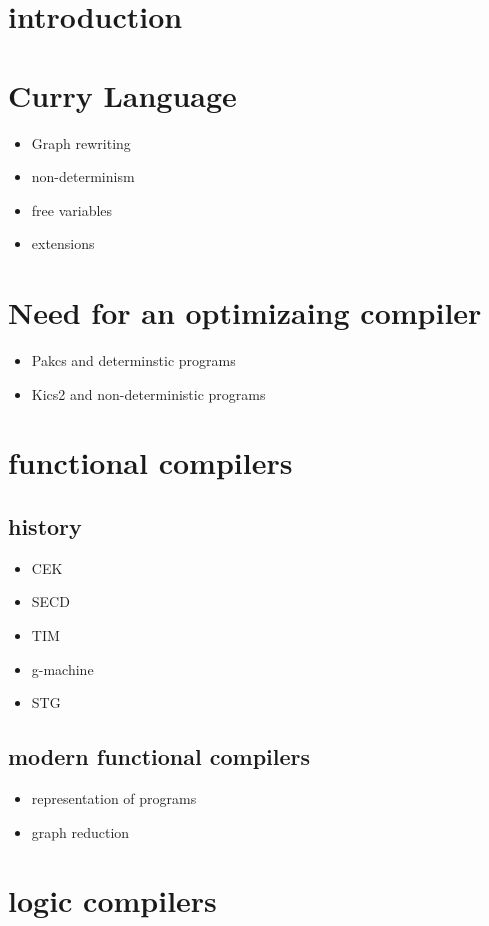 \documentclass{article}
\begin{document}
\begin{abstract}
\end{abstract}

\section{introduction}
\section{Curry Language}
\begin{itemize}
    \item Graph rewriting
    \item non-determinism
    \item free variables
    \item extensions
\end{itemize}
\section{Need for an optimizaing compiler}
\begin{itemize}
    \item Pakcs and determinstic programs
    \item Kics2 and non-deterministic programs
\end{itemize}
\section{functional compilers}
\subsection{history}
\begin{itemize}
    \item CEK
    \item SECD
    \item TIM
    \item g-machine
    \item STG
\end{itemize}
\subsection{modern functional compilers}
\begin{itemize}
    \item representation of programs
    \item graph reduction
\end{itemize}
\section{logic compilers}
\end{document}
